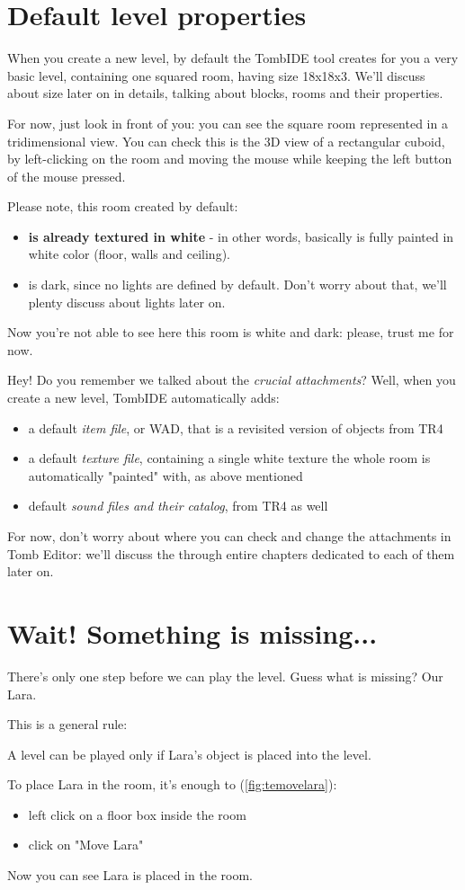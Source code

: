 \section{Default level properties}
When you create a new level, by default the TombIDE tool creates for you a very basic level, containing one squared room, having size 18x18x3.
We'll discuss about size later on in details, talking about blocks, rooms and their properties.
\par For now, just look in front of you: you can see the square room represented in a tridimensional view. You can check this is the 3D view of a rectangular cuboid, by left-clicking on the room and moving the mouse while keeping the left button of the mouse pressed.
\par Please note, this room created by default:
\begin{itemize}
    \item \textbf{is already textured in white} - in other words, basically is fully painted in white color (floor, walls and ceiling).
    \item is dark, since no lights are defined by default. Don't worry about that, we'll plenty discuss about lights later on.
\end{itemize}
Now you're not able to see here this room is white and dark: please, trust me for now.
\par Hey! Do you remember we talked about the \emph{crucial attachments}? Well, when you create a new level, TombIDE automatically adds:
\begin{itemize}
    \item a default \emph{item file}, or WAD, that is a revisited version of objects from TR4
    \item a default \emph{texture file}, containing a single white texture the whole room is automatically "painted" with, as above mentioned
    \item default \emph{sound files and their catalog}, from TR4 as well
\end{itemize}
For now, don't worry about where you can check and change the attachments in Tomb Editor: we'll discuss the through entire chapters dedicated to each of them later on.

\section{Wait! Something is missing...}

There's only one step before we can play the level. Guess what is missing? Our Lara.
\par This is a general rule:
\begin{remark}
A level can be played only if Lara's object is placed into the level.
\end{remark}
To place Lara in the room, it's enough to (\ref{fig:temovelara}):
\begin{itemize}
    \item left click on a floor box inside the room
    \item click on "Move Lara"
\end{itemize}
Now you can see Lara is placed in the room.

